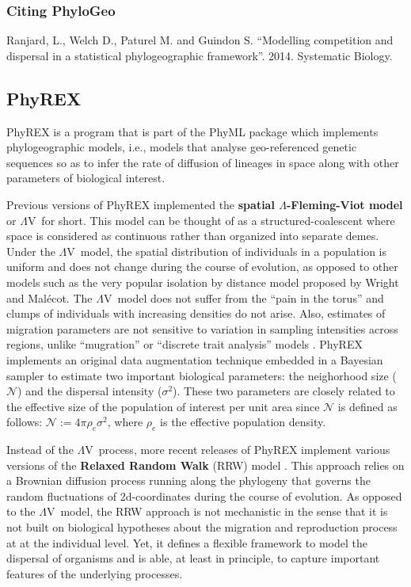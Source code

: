 \documentclass[a4paper,12pt]{article}
\newcommand{\sfv}{$\Lambda$V}
\begin{document}
\subsubsection{Citing PhyloGeo}\label{sec:citephylogeo}

Ranjard, L., Welch D., Paturel M. and Guindon S. ``Modelling competition  and  dispersal in a
statistical phylogeographic framework''. 2014. Systematic Biology.



\subsection{PhyREX}

PhyREX is a program that is part of the PhyML package which implements phylogeographic
models, i.e., models that analyse geo-referenced genetic sequences so as to infer the rate of
diffusion of lineages in space along with other parameters of biological interest.


Previous versions of PhyREX implemented the {\bf spatial $\Lambda$-Fleming-Viot model}
\cite{etheridge2008,berestycki2009,barton2010,barton2010b,veber2012,barton2013} or \sfv\ for short.
This model can be thought of as a structured-coalescent where space is considered as continuous
rather than organized into separate demes. Under the \sfv\ model, the spatial distribution of individuals in a population is uniform and does
not change during the course of evolution, as opposed to other models such as the very popular
isolation by distance model proposed by Wright and Mal\'ecot. The \sfv\ model  does not
suffer from the ``pain in the torus'' \cite{felsenstein1975} and clumps of individuals with
increasing densities do not arise. Also, estimates of migration parameters are not sensitive to
variation in sampling intensities across regions, unlike ``mugration'' or ``discrete trait
analysis'' models \cite{lemey2009}. PhyREX implements an original data augmentation technique embedded in a Bayesian sampler to
estimate two important biological parameters: the neighorhood size ($\mathcal{N}$) and the dispersal
intensity ($\sigma^2$). These two parameters are closely related to the effective size of the
population of interest per unit area since $\mathcal{N}$ is defined as follows: $\mathcal{N} := 4\pi
\rho_e \sigma^2$, where $\rho_e$ is the effective population density.

Instead of the \sfv\ process, more recent releases of PhyREX implement various versions of the {\bf
  Relaxed Random Walk} (RRW) model
\cite{lemey2010}. This approach relies on a Brownian diffusion process running
along the phylogeny that governs the random fluctuations of 2d-coordinates during the course of
evolution. As opposed to the \sfv\ model, the RRW approach is not mechanistic in the sense that
it is not built on biological hypotheses about the migration and reproduction process at at the
individual level. Yet, it defines a flexible framework to model the dispersal of organisms and is
able, at least in principle, to capture important features of the underlying processes.
\end{document}
